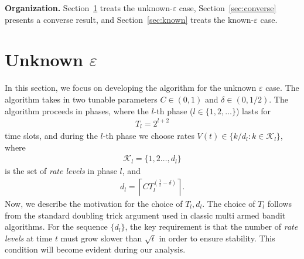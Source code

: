 \documentclass[12pt,draftcls, onecolumn]{IEEEtran}
\begin{document}
\noindent
\textbf{Organization.}
Section~\ref{sec:unknown} treats the unknown-\(\varepsilon\) case, Section~\ref{sec:converse} presents a converse result, and Section~\ref{sec:known} treats the known-\(\varepsilon\) case.
\section{Unknown $\varepsilon$}\label{sec:unknown}
In this section, we focus on developing the algorithm for the unknown $\varepsilon$ case. The algorithm takes in two tunable parameters $C \in (0,1)$ and $\delta \in (0,1/2)$. The algorithm proceeds in phases, where the $l$-th phase ($l \in \{1,2,\dots\}$) lasts for 
\begin{align}\label{eqn:t_l}
    T_l = 2^{l+2} 
\end{align}
time slots, and during the $l$-th phase we choose rates $V(t) \in \{k/d_l: k \in \mathcal{K}_l\}$, where 
\begin{align}\label{eqn:rate_levels}
    \mathcal{K}_l = \{1,2\dots,d_l\}
\end{align}
is the set of \emph{rate levels} in phase $l$, and 
\begin{align}\label{eqn:K_l}
    d_l= \left\lceil C T_l^{\left(\frac{1}{2}-\delta\right)}\right\rceil.
\end{align}
Now, we describe the motivation for the choice of $T_l,d_l$. The choice of $T_l$ follows from the standard doubling trick argument used in classic multi armed bandit algorithms. For the sequence $\{d_l\}$, the key requirement is that the number of \emph{rate levels} at time $t$ must grow slower than $\sqrt{t}$ in order to ensure stability. This condition will become evident during our analysis.
\end{document}
